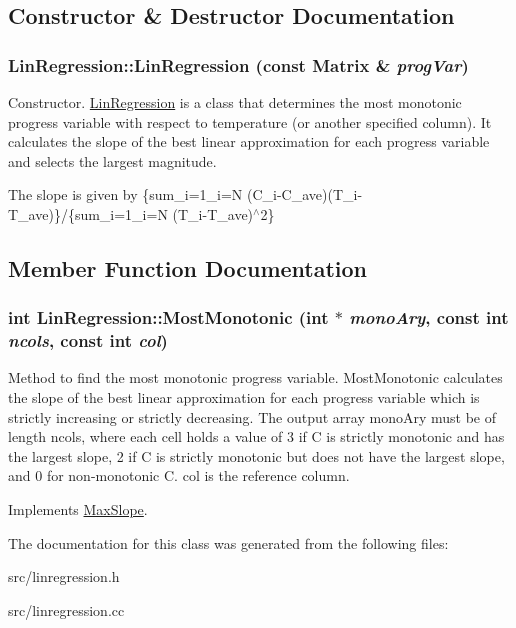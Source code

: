 \subsection{Constructor \& Destructor Documentation}
\hypertarget{classLinRegression_a0d747e38f7a8997765be15f43062290c}{
\subsubsection[{LinRegression}]{\setlength{\rightskip}{0pt plus 5cm}LinRegression::LinRegression (const {\bf Matrix} \& {\em progVar})}}
\label{de/d89/classLinRegression_a0d747e38f7a8997765be15f43062290c}


Constructor. \hyperlink{classLinRegression}{LinRegression} is a class that determines the most monotonic progress variable with respect to temperature (or another specified column). It calculates the slope of the best linear approximation for each progress variable and selects the largest magnitude.

The slope is given by \{sum\_\-i=1\_\-i=N (C\_\-i-\/C\_\-ave)(T\_\-i-\/T\_\-ave)\}/\{sum\_\-i=1\_\-i=N (T\_\-i-\/T\_\-ave)$^\wedge$2\} 

\subsection{Member Function Documentation}
\hypertarget{classLinRegression_a1f245c4e47637f3f1d94f6129861406d}{
\subsubsection[{MostMonotonic}]{\setlength{\rightskip}{0pt plus 5cm}int LinRegression::MostMonotonic (int $\ast$ {\em monoAry}, \/  const int {\em ncols}, \/  const int {\em col})}}
\label{de/d89/classLinRegression_a1f245c4e47637f3f1d94f6129861406d}


Method to find the most monotonic progress variable. MostMonotonic calculates the slope of the best linear approximation for each progress variable which is strictly increasing or strictly decreasing. The output array monoAry must be of length ncols, where each cell holds a value of 3 if C is strictly monotonic and has the largest slope, 2 if C is strictly monotonic but does not have the largest slope, and 0 for non-\/monotonic C. col is the reference column. 

Implements \hyperlink{classMaxSlope_a494b1b1ae073d3b29fe7cdc023ce7861}{MaxSlope}.

The documentation for this class was generated from the following files:\begin{DoxyCompactItemize}
\item 
src/linregression.h\item 
src/linregression.cc\end{DoxyCompactItemize}
